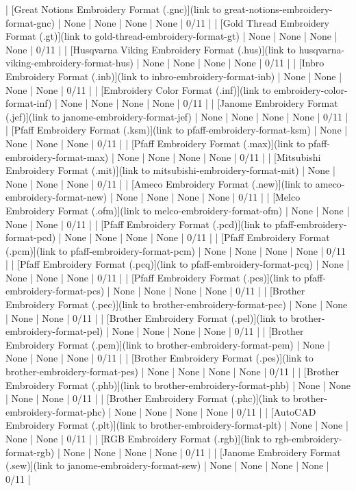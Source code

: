 \documentclass[a4paper, 11pt]{report}
\begin{document}
| [Great Notions Embroidery Format (.gnc)](link to great-notions-embroidery-format-gnc) | None | None | None | None | 0/11 |
| [Gold Thread Embroidery Format (.gt)](link to gold-thread-embroidery-format-gt) | None | None | None | None | 0/11 |
| [Husqvarna Viking Embroidery Format (.hus)](link to husqvarna-viking-embroidery-format-hus) | None | None | None | None | 0/11 |
| [Inbro Embroidery Format (.inb)](link to inbro-embroidery-format-inb) | None | None | None | None | 0/11 |
| [Embroidery Color Format (.inf)](link to embroidery-color-format-inf) | None | None | None | None | 0/11 |
| [Janome Embroidery Format (.jef)](link to janome-embroidery-format-jef) | None | None | None | None | 0/11 |
| [Pfaff Embroidery Format (.ksm)](link to pfaff-embroidery-format-ksm) | None | None | None | None | 0/11 |
| [Pfaff Embroidery Format (.max)](link to pfaff-embroidery-format-max) | None | None | None | None | 0/11 |
| [Mitsubishi Embroidery Format (.mit)](link to mitsubishi-embroidery-format-mit) | None | None | None | None | 0/11 |
| [Ameco Embroidery Format (.new)](link to ameco-embroidery-format-new) | None | None | None | None | 0/11 |
| [Melco Embroidery Format (.ofm)](link to melco-embroidery-format-ofm) | None | None | None | None | 0/11 |
| [Pfaff Embroidery Format (.pcd)](link to pfaff-embroidery-format-pcd) |  None | None | None | None | 0/11 |
| [Pfaff Embroidery Format (.pcm)](link to pfaff-embroidery-format-pcm) | None | None | None | None | 0/11 |
| [Pfaff Embroidery Format (.pcq)](link to pfaff-embroidery-format-pcq) | None | None | None | None | 0/11 |
| [Pfaff Embroidery Format (.pcs)](link to pfaff-embroidery-format-pcs) | None | None | None | None | 0/11 |
| [Brother Embroidery Format (.pec)](link to brother-embroidery-format-pec) | None | None | None | None | 0/11 |
| [Brother Embroidery Format (.pel)](link to brother-embroidery-format-pel) | None | None | None | None | 0/11 |
| [Brother Embroidery Format (.pem)](link to brother-embroidery-format-pem) | None | None | None | None | 0/11 |
| [Brother Embroidery Format (.pes)](link to brother-embroidery-format-pes) | None | None | None | None | 0/11 |
| [Brother Embroidery Format (.phb)](link to brother-embroidery-format-phb) | None | None | None | None | 0/11 |
| [Brother Embroidery Format (.phc)](link to brother-embroidery-format-phc) | None | None | None | None | 0/11 |
| [AutoCAD Embroidery Format (.plt)](link to brother-embroidery-format-plt) | None | None | None | None | 0/11 |
| [RGB Embroidery Format (.rgb)](link to rgb-embroidery-format-rgb) | None | None | None | None | 0/11 |
| [Janome Embroidery Format (.sew)](link to janome-embroidery-format-sew) | None | None | None | None | 0/11 |
\end{document}
